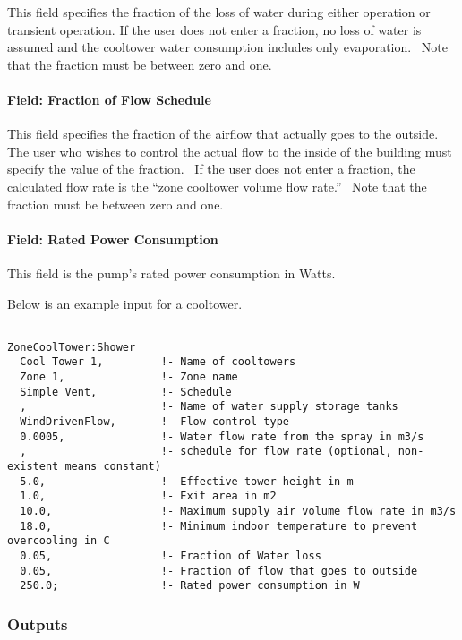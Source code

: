 This field specifies the fraction of the loss of water during either operation or transient operation. If the user does not enter a fraction, no loss of water is assumed and the cooltower water consumption includes only evaporation.~ Note that the fraction must be between zero and one.

\paragraph{Field: Fraction of Flow Schedule}\label{field-fraction-of-flow-schedule}

This field specifies the fraction of the airflow that actually goes to the outside.~ The user who wishes to control the actual flow to the inside of the building must specify the value of the fraction.~ If the user does not enter a fraction, the calculated flow rate is the ``zone cooltower volume flow rate.''~ Note that the fraction must be between zero and one.

\paragraph{Field: Rated Power Consumption}\label{field-rated-power-consumption}

This field is the pump's rated power consumption in Watts.

Below is an example input for a cooltower.

\begin{lstlisting}

ZoneCoolTower:Shower
  Cool Tower 1,         !- Name of cooltowers
  Zone 1,               !- Zone name
  Simple Vent,          !- Schedule
  ,                     !- Name of water supply storage tanks
  WindDrivenFlow,       !- Flow control type
  0.0005,               !- Water flow rate from the spray in m3/s
  ,                     !- schedule for flow rate (optional, non-existent means constant)
  5.0,                  !- Effective tower height in m
  1.0,                  !- Exit area in m2
  10.0,                 !- Maximum supply air volume flow rate in m3/s
  18.0,                 !- Minimum indoor temperature to prevent overcooling in C
  0.05,                 !- Fraction of Water loss
  0.05,                 !- Fraction of flow that goes to outside
  250.0;                !- Rated power consumption in W
\end{lstlisting}

\subsubsection{Outputs}\label{outputs-6-000}

